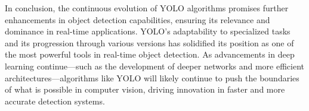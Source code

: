 %
In conclusion, the continuous evolution of YOLO algorithms promises further enhancements in object detection capabilities, ensuring its relevance and dominance in real-time applications. YOLO’s adaptability to specialized tasks and its progression through various versions has solidified its position as one of the most powerful tools in real-time object detection. As advancements in deep learning continue—such as the development of deeper networks and more efficient architectures—algorithms like YOLO will likely continue to push the boundaries of what is possible in computer vision, driving innovation in faster and more accurate detection systems.
%
%
%